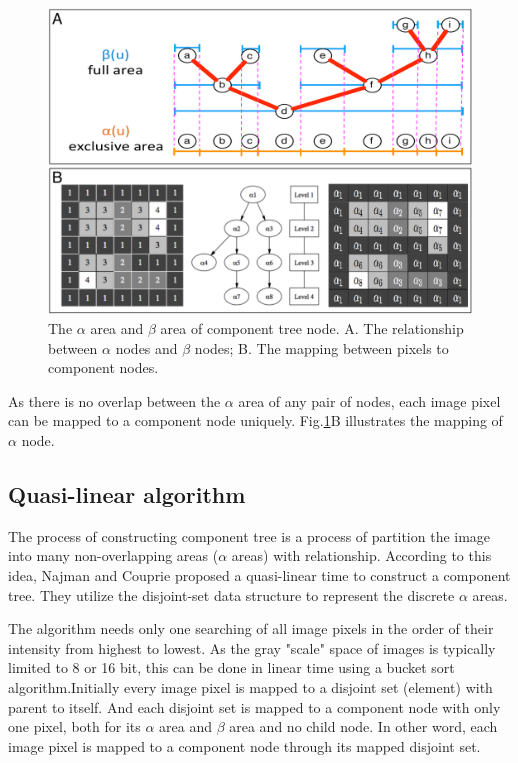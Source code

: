 \begin{figure}[htbp]
\centering
\includegraphics[width=1.0\textwidth]{images/cptree_alpha}
\caption[The $\alpha$ area and $\beta$ area of component tree node]{The $\alpha$ area and $\beta$ area of component tree node. A. The relationship between $\alpha$ nodes and $\beta$ nodes; B. The mapping between pixels to component nodes.}
\label{fig:cptree-alpha}
\end{figure}

As there is no overlap between the $\alpha$ area of any pair of nodes, each image pixel can be mapped to a component node uniquely. Fig.\ref{fig:cptree-alpha}B illustrates the mapping of $\alpha$ node.

\subsection{Quasi-linear algorithm}
The process of constructing component tree is a process of partition the image into many non-overlapping areas ($\alpha$ areas) with relationship. According to this idea, Najman and Couprie \cite{najman2006building} proposed a quasi-linear time to construct a component tree. They utilize the disjoint-set data structure  to represent the discrete $\alpha$ areas.

The algorithm needs only one searching of all image pixels in the order of their intensity from highest to lowest. As the gray "scale" space of images is typically limited to 8 or 16 bit, this can be done in linear time using a bucket sort algorithm.Initially every image pixel is mapped to a disjoint set (element) with parent to itself. And each disjoint set is mapped to a component node with only one pixel, both for its $\alpha$ area and $\beta$ area and no child node. In other word, each image pixel is mapped to a component node through its mapped disjoint set.

